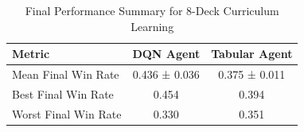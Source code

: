 \begin{table}[h!]
\centering
\caption{Final Performance Summary for 8-Deck Curriculum Learning}
\label{tab:final_performance_8deck}
\begin{tabular}{lcc}
\hline
Metric & DQN Agent & Tabular Agent \\
\hline
Mean Final Win Rate & 0.436 ± 0.036 & 0.375 ± 0.011 \\
Best Final Win Rate & 0.454 & 0.394 \\
Worst Final Win Rate & 0.330 & 0.351 \\
\hline
\end{tabular}
\end{table}
